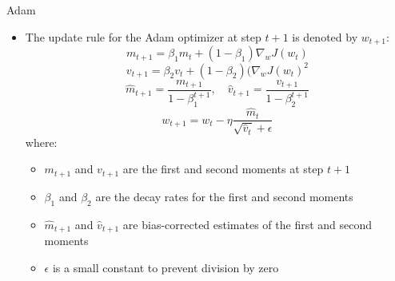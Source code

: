 \documentclass[serif, aspectratio=169]{beamer}
\begin{document}
\begin{frame}{Adam}
    \begin{itemize}
        \item The update rule for the Adam optimizer at step $t+1$ is denoted by $w_{t+1}$:
        \[m_{t+1} = \beta_1 m_t + (1 - \beta_1) \nabla_w J(w_t)\]
        \[v_{t+1} = \beta_2 v_t + (1 - \beta_2) (\nabla_w J(w_t)^2\]
        \[\hat{m}_{t+1} = \frac{m_{t+1}}{1 - \beta_1^{t+1}}, \quad 
        \hat{v}_{t+1} = \frac{v_{t+1}}{1 - \beta_2^{t+1}}\]
        \[w_{t+1} = w_t - \eta \frac{\hat{m}_t}{\sqrt{\hat{v}_t} + \epsilon}\]
        where:
        \begin{itemize}
            \item $m_{t+1}$ and $v_{t+1}$ are the first and second moments at step $t+1$
            \item $\beta_1$ and $\beta_2$ are the decay rates for the first and second moments
            \item $\hat{m}_{t+1}$ and $\hat{v}_{t+1}$ are bias-corrected estimates of the first and second moments
            \item $\epsilon$ is a small constant to prevent division by zero
        \end{itemize}
    \end{itemize}

\end{frame}
\end{document}
